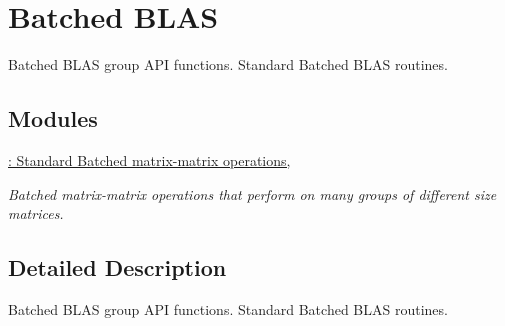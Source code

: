 \hypertarget{group__group__batched__blas}{}\section{Batched B\+L\+AS}
\label{group__group__batched__blas}


Batched B\+L\+AS group A\+PI functions. Standard Batched B\+L\+AS routines.  


\subsection*{Modules}
\begin{DoxyCompactItemize}
\item 
\hyperlink{group__group__blas3}{\+: Standard Batched matrix-\/matrix operations,}
\begin{DoxyCompactList}\small\item\em Batched matrix-\/matrix operations that perform on many groups of different size matrices. \end{DoxyCompactList}\end{DoxyCompactItemize}


\subsection{Detailed Description}
Batched B\+L\+AS group A\+PI functions. Standard Batched B\+L\+AS routines. 



